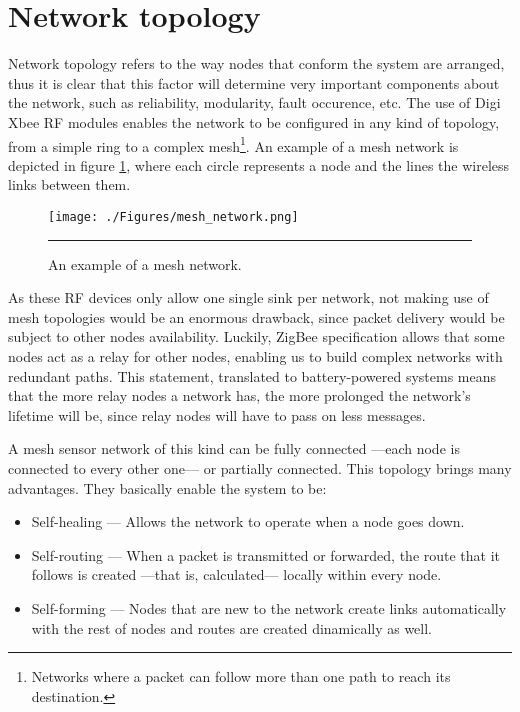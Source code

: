 
\section{Network topology}

Network topology refers to the way nodes that conform the system are arranged, thus it is clear that this factor will determine very important components about the network, such as reliability, modularity, fault occurence, etc. The use of Digi Xbee\textregistered{} RF modules enables the network to be configured in any kind of topology, from a simple ring to a complex mesh\footnote{Networks where a packet can follow more than one path to reach its destination.}. An example of a mesh network is depicted in figure \ref{fig:MeshNet}, where each circle represents a node and the lines the wireless links between them.

\begin{figure}[htbp]
    \centering
        \texttt{[image: ./Figures/mesh\_network.png]}
        \rule{35em}{0.5pt}
    \caption[Mesh Network]{An example of a mesh network.}
    \label{fig:MeshNet}
\end{figure}

As these RF devices only allow one single sink per network, not making use of mesh topologies would be an enormous drawback, since packet delivery would be subject to other nodes availability. Luckily, ZigBee specification allows that some nodes act as a relay for other nodes, enabling us to build complex networks with redundant paths. This statement, translated to battery-powered systems means that the more relay nodes a network has, the more prolonged the network's lifetime will be\citep{hou2005energy}, since relay nodes will have to pass on less messages.


A mesh sensor network of this kind can be fully connected ---each node is connected to every other one--- or partially connected. This topology brings many advantages. They basically enable the system to be:

\begin{itemize}
    \item Self-healing --- Allows the network to operate when a node goes down.
    \item Self-routing --- When a packet is transmitted or forwarded, the route that it follows is created ---that is, calculated--- locally within every node.
    \item Self-forming --- Nodes that are new to the network create links automatically with the rest of nodes and routes are created dinamically as well.
\end{itemize}

